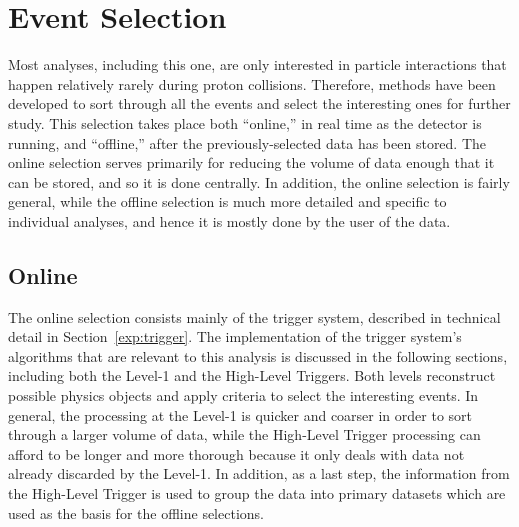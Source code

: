 \newcommand{\AVal}{0.423}
\newcommand{\AEcalVal}{0.387}

\chapter{Event Selection}
\label{evSel}
Most analyses, including this one, are only interested in particle 
interactions that happen relatively rarely during proton collisions.  
Therefore, methods have been developed to sort through all the 
events and select the interesting ones for further study.  
This selection takes place both ``online,'' in real time as the 
detector is running, and ``offline,'' after the previously-selected data has 
been stored.  
The online selection serves primarily for reducing the 
volume of data 
enough that it can be stored, 
and so it is done centrally. 
In addition, the online selection is fairly general, 
while the offline selection is much more detailed and specific to individual 
analyses, and hence it is mostly done by the user of the data.  


\section{Online}
\label{evSel:online}
The online selection consists mainly of the trigger system, 
described in technical detail in Section~\ref{exp:trigger}.  
The implementation of the trigger system's algorithms 
that are relevant to this analysis 
is discussed in the following sections, 
including both the Level-1 and the High-Level Triggers.  
Both levels reconstruct possible physics objects 
and apply criteria to select the interesting events.  
In general, the processing at the Level-1 is quicker 
and coarser in order to sort through a larger volume of data, 
while the High-Level Trigger processing can afford to be 
longer and more thorough because it only deals with 
data not already discarded by the Level-1.  
In addition, as a last step, the information 
from the High-Level Trigger is used to 
group the data into primary datasets
which are used as the basis for the offline selections.  

